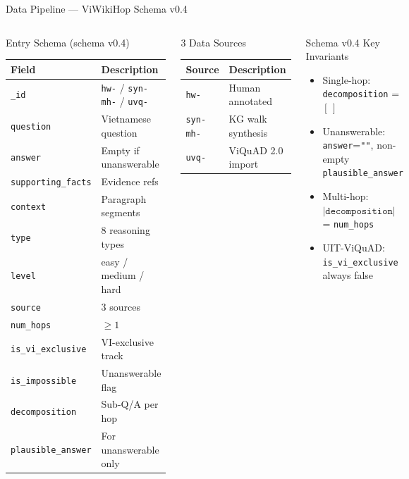 \documentclass[aspectratio=169]{beamer}
\begin{document}
\begin{frame}[shrink=20]{Data Pipeline --- ViWikiHop Schema v0.4}
\begin{columns}[T]
\begin{block}{Entry Schema (schema v0.4)}
{\scriptsize
\begin{tabular}{@{}lp{3.2cm}@{}}
\toprule
\textbf{Field} & \textbf{Description} \\
\midrule
\texttt{\_id}           & \texttt{hw-} / \texttt{syn-mh-} / \texttt{uvq-} \\
\texttt{question}       & Vietnamese question \\
\texttt{answer}         & Empty if unanswerable \\
\texttt{supporting\_facts} & Evidence refs \\
\texttt{context}        & Paragraph segments \\
\texttt{type}           & 8 reasoning types \\
\texttt{level}          & easy / medium / hard \\
\texttt{source}         & 3 sources \\
\texttt{num\_hops}      & $\geq 1$ \\
\texttt{is\_vi\_exclusive} & VI-exclusive track \\
\texttt{is\_impossible} & Unanswerable flag \\
\texttt{decomposition}  & Sub-Q/A per hop \\
\texttt{plausible\_answer} & For unanswerable only \\
\bottomrule
\end{tabular}
}
\end{block}

\begin{block}{3 Data Sources}
\begin{tabular}{@{}ll@{}}
\toprule
\textbf{Source} & \textbf{Description} \\
\midrule
\texttt{hw-}      & Human annotated \\
\texttt{syn-mh-}  & KG walk synthesis \\
\texttt{uvq-}     & ViQuAD 2.0 import \\
\bottomrule
\end{tabular}
\end{block}

\begin{alertblock}{Schema v0.4 Key Invariants}
\begin{itemize}\scriptsize\setlength\itemsep{2pt}
  \item Single-hop: \texttt{decomposition} = $[\,]$
  \item Unanswerable: \texttt{answer}=\texttt{""}, non-empty \texttt{plausible\_answer}
  \item Multi-hop: $|\texttt{decomposition}|$ = \texttt{num\_hops}
  \item UIT-ViQuAD: \texttt{is\_vi\_exclusive} always false
\end{itemize}
\end{alertblock}
\end{columns}
\end{frame}
\end{document}
